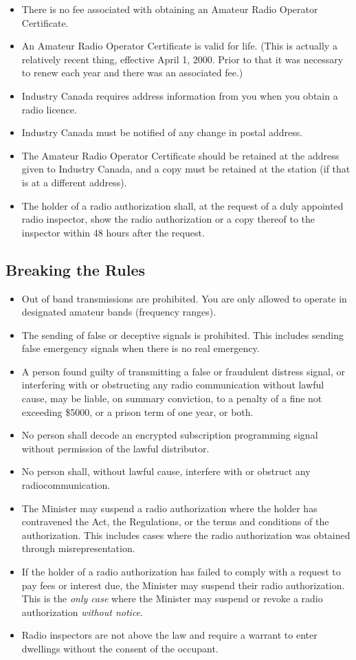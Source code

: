 \documentclass[letterpaper,12pt]{scrartcl}
\begin{document}
\begin{itemize}
\item There is no fee associated with obtaining an Amateur Radio Operator Certificate.
\item An Amateur Radio Operator Certificate is valid for life. (This is actually a relatively recent thing, effective April 1, 2000. Prior to that it was necessary to renew each year and there was an associated fee.)
\item Industry Canada requires address information from you when you obtain a radio licence.
\item Industry Canada must be notified of any change in postal address.
\item The Amateur Radio Operator Certificate should be retained at the address given to Industry Canada, and a copy must be retained at the station (if that is at a different address).
\item The holder of a radio authorization shall, at the request of a duly appointed radio inspector, show the radio authorization or a copy thereof to the inspector within 48 hours after the request.
\end{itemize}

\subsection{Breaking the Rules}

\begin{itemize}
\item Out of band transmissions are prohibited. You are only allowed to operate in designated amateur bands (frequency ranges).
\item The sending of false or deceptive signals is prohibited. This includes sending false emergency signals when there is no real emergency.
\item A person found guilty of transmitting a false or fraudulent distress signal, or interfering with or obstructing any radio communication without lawful cause,
may be liable, on summary conviction, to a penalty of a fine not exceeding \$5000, or a prison term of one year, or both.
\item No person shall decode an encrypted subscription programming signal without permission of the lawful distributor.
\item No person shall, without lawful cause, interfere with or obstruct any radiocommunication.
\item The Minister may suspend a radio authorization where the holder has contravened the Act, the Regulations, or the terms and conditions of the authorization.
This includes cases where the radio authorization was obtained through misrepresentation. 
\item If the holder of a radio authorization has failed to comply with a request to pay fees or interest due, the Minister may suspend their radio authorization.
This is the \textit{only case} where the Minister may suspend or revoke a radio authorization \textit{without notice}.
\item Radio inspectors are not above the law and require a warrant to enter dwellings without the consent of the occupant.
\end{itemize}
\end{document}
